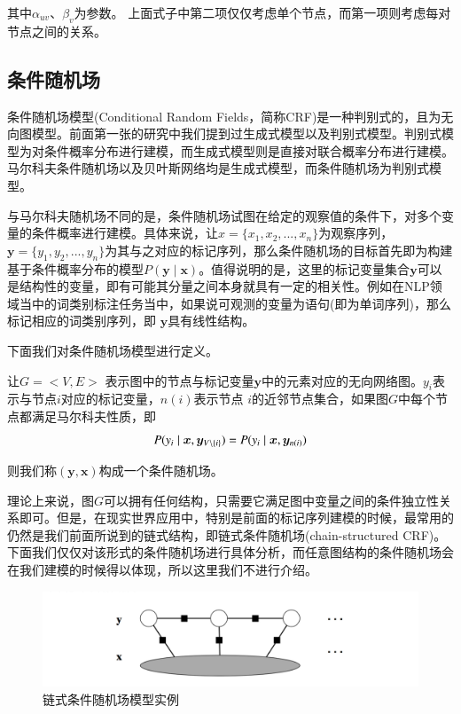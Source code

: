 其中$\alpha_{uv}$、$\beta_v$为参数。 上面式子中第二项仅仅考虑单个节点，而第一项则考虑每对节点之间的关系。



\subsection{条件随机场}
条件随机场模型(Conditional Random Fields，简称CRF)是一种判别式的，且为无向图模型。前面第一张的研究中我们提到过生成式模型以及判别式模型。判别式模型为对条件概率分布进行建模，而生成式模型则是直接对联合概率分布进行建模。马尔科夫条件随机场以及贝叶斯网络均是生成式模型，而条件随机场为判别式模型。


与马尔科夫随机场不同的是，条件随机场试图在给定的观察值的条件下，对多个变量的条件概率进行建模。具体来说，让$x = \{x_1, x_2,...,x_n\}$为观察序列，$\bm{y} = \{y_1, y_2,...,y_n\}$为其与之对应的标记序列，那么条件随机场的目标首先即为构建基于条件概率分布的模型$P(\bm{y} \mid \bm{x})$。值得说明的是，这里的标记变量集合$\bm{y}$可以是结构性的变量，即有可能其分量之间本身就具有一定的相关性。例如在NLP领域当中的词类别标注任务当中，如果说可观测的变量为语句(即为单词序列)，那么标记相应的词类别序列，即 $\bm{y}$具有线性结构。


下面我们对条件随机场模型进行定义。

让$G = <V,E>$ 表示图中的节点与标记变量$\bm{y}$中的元素对应的无向网络图。$y_i$表示与节点$i$对应的标记变量，$n(i)$表示节点
$i$的近邻节点集合，如果图$G$中每个节点都满足马尔科夫性质，即
\begin{equation}
P(y_i \mid \bm{x},\bm{y}_{V \backslash \{i\}}) = P(y_i \mid \bm{x}, \bm{y}_{n(i)}) \\
\end{equation}

则我们称$(\bm{y}, \bm{x})$构成一个条件随机场。


理论上来说，图$G$可以拥有任何结构，只需要它满足图中变量之间的条件独立性关系即可。但是，在现实世界应用中，特别是前面的标记序列建模的时候，最常用的仍然是我们前面所说到的链式结构，即链式条件随机场(chain-structured CRF)。下面我们仅仅对该形式的条件随机场进行具体分析，而任意图结构的条件随机场会在我们建模的时候得以体现，所以这里我们不进行介绍。



\begin{figure}[ht]
    \centering
    \includegraphics[scale=1, width=\textwidth]{figure/linearchain-crf.PNG}
    \caption{链式条件随机场模型实例}
    \label{fig-linear-crf}
\end{figure}


